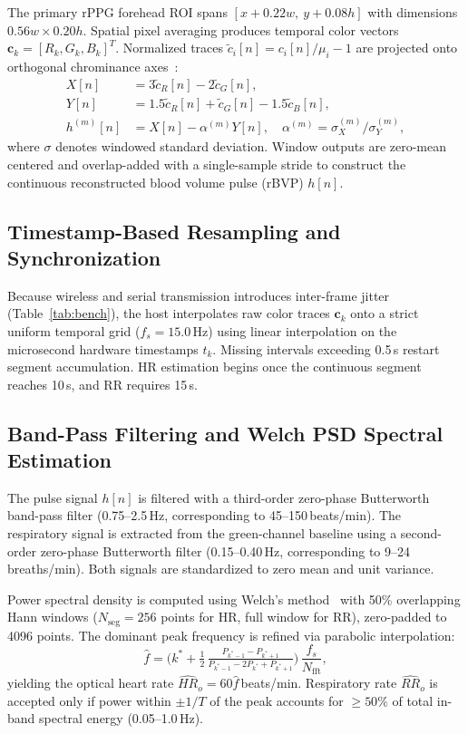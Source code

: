 \documentclass[journal]{IEEEtran}
\newcommand{\HR}{\mathit{HR}}
\newcommand{\RR}{\mathit{RR}}
\begin{document}
The primary rPPG forehead ROI spans $[x+0.22w,\ y+0.08h]$ with dimensions $0.56w \times 0.20h$. Spatial pixel averaging produces temporal color vectors $\mathbf c_k = [R_k, G_k, B_k]^T$. Normalized traces $\tilde c_i[n] = c_i[n]/\mu_i - 1$ are projected onto orthogonal chrominance axes~\cite{dehaan2013chrom}:
\begin{align}
  X[n] &= 3\tilde c_R[n] - 2\tilde c_G[n], \label{eq:chromx}\\
  Y[n] &= 1.5\tilde c_R[n] + \tilde c_G[n] - 1.5\tilde c_B[n], \label{eq:chromy}\\
  h^{(m)}[n] &= X[n] - \alpha^{(m)} Y[n],\quad \alpha^{(m)} = \sigma_X^{(m)}/\sigma_Y^{(m)}, \label{eq:chromh}
\end{align}
where $\sigma$ denotes windowed standard deviation. Window outputs are zero-mean centered and overlap-added with a single-sample stride to construct the continuous reconstructed blood volume pulse (rBVP) $h[n]$.

\subsection{Timestamp-Based Resampling and Synchronization}
Because wireless and serial transmission introduces inter-frame jitter (Table~\ref{tab:bench}), the host interpolates raw color traces $\mathbf c_k$ onto a strict uniform temporal grid ($f_s = 15.0$\,Hz) using linear interpolation on the microsecond hardware timestamps $t_k$. Missing intervals exceeding 0.5\,s restart segment accumulation. HR estimation begins once the continuous segment reaches 10\,s, and RR requires 15\,s.

\subsection{Band-Pass Filtering and Welch PSD Spectral Estimation}
The pulse signal $h[n]$ is filtered with a third-order zero-phase Butterworth band-pass filter (0.75--2.5\,Hz, corresponding to 45--150\,beats/min). The respiratory signal is extracted from the green-channel baseline using a second-order zero-phase Butterworth filter (0.15--0.40\,Hz, corresponding to 9--24\,breaths/min). Both signals are standardized to zero mean and unit variance.

Power spectral density is computed using Welch's method~\cite{welch1967} with 50\% overlapping Hann windows ($N_{\mathrm{seg}}=256$ points for HR, full window for RR), zero-padded to 4096 points. The dominant peak frequency is refined via parabolic interpolation:
\begin{equation}
  \hat f = \Big(k^* + \tfrac{1}{2}\,\tfrac{P_{k^*-1} - P_{k^*+1}}{P_{k^*-1} - 2P_{k^*} + P_{k^*+1}}\Big)\,\frac{f_s}{N_{\mathrm{fft}}},
  \label{eq:parabolic}
\end{equation}
yielding the optical heart rate $\widehat{\HR}_o = 60 \hat f$\,beats/min. Respiratory rate $\widehat{\RR}_o$ is accepted only if power within $\pm 1/T$ of the peak accounts for $\ge 50\%$ of total in-band spectral energy (0.05--1.0\,Hz).
\end{document}
